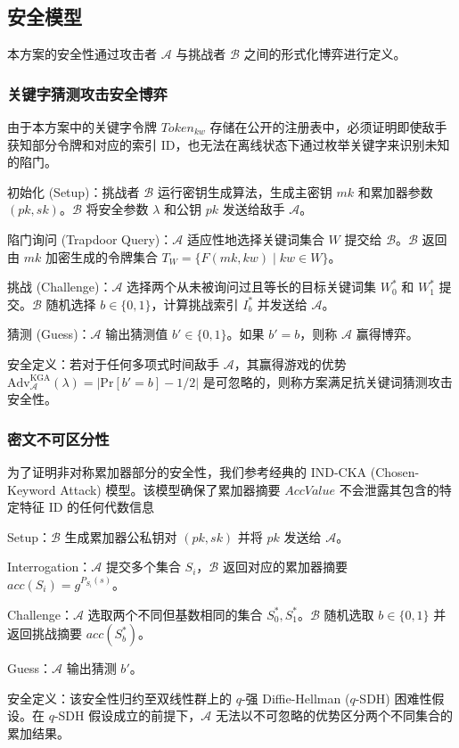 \subsection{安全模型}
本方案的安全性通过攻击者 $\mathcal{A}$ 与挑战者 $\mathcal{B}$ 之间的形式化博弈进行定义。
\subsubsection{关键字猜测攻击安全博弈}
由于本方案中的关键字令牌 $Token_{kw}$ 存储在公开的注册表中，必须证明即使敌手获知部分令牌和对应的索引 ID，也无法在离线状态下通过枚举关键字来识别未知的陷门。

初始化 (Setup)：挑战者 $\mathcal{B}$ 运行密钥生成算法，生成主密钥 $mk$ 和累加器参数 $(pk, sk)$。$\mathcal{B}$ 将安全参数 $\lambda$ 和公钥 $pk$ 发送给敌手 $\mathcal{A}$。

陷门询问 (Trapdoor Query)：$\mathcal{A}$ 适应性地选择关键词集合 $W$ 提交给 $\mathcal{B}$。$\mathcal{B}$ 返回由 $mk$ 加密生成的令牌集合 $T_W = \{F(mk, kw) \mid kw \in W\}$。

挑战 (Challenge)：$\mathcal{A}$ 选择两个从未被询问过且等长的目标关键词集 $W_0^*$ 和 $W_1^*$ 提交。$\mathcal{B}$ 随机选择 $b \in \{0,1\}$，计算挑战索引 $I_b^*$ 并发送给 $\mathcal{A}$。

猜测 (Guess)：$\mathcal{A}$ 输出猜测值 $b' \in \{0, 1\}$。如果 $b' = b$，则称 $\mathcal{A}$ 赢得博弈。

安全定义：若对于任何多项式时间敌手 $\mathcal{A}$，其赢得游戏的优势 $\mathrm{Adv}_{\mathcal{A}}^{\mathrm{KGA}}(\lambda) = |\mathrm{Pr}[b'=b] - 1/2|$ 是可忽略的，则称方案满足抗关键词猜测攻击安全性。
\subsubsection{密文不可区分性}
为了证明非对称累加器部分的安全性，我们参考经典的 IND-CKA (Chosen-Keyword Attack) 模型。该模型确保了累加器摘要 $AccValue$ 不会泄露其包含的特定特征 ID 的任何代数信息

Setup：$\mathcal{B}$ 生成累加器公私钥对 $(pk, sk)$ 并将 $pk$ 发送给 $\mathcal{A}$。

Interrogation：$\mathcal{A}$ 提交多个集合 $S_i$，$\mathcal{B}$ 返回对应的累加器摘要 $acc(S_i) = g^{P_{S_i}(s)}$。

Challenge：$\mathcal{A}$ 选取两个不同但基数相同的集合 $S_0^*, S_1^*$。$\mathcal{B}$ 随机选取 $b \in \{0, 1\}$ 并返回挑战摘要 $acc(S_b^*)$。

Guess：$\mathcal{A}$ 输出猜测 $b'$。

安全定义：该安全性归约至双线性群上的 $q$-强 Diffie-Hellman ($q$-SDH) 困难性假设。在 $q$-SDH 假设成立的前提下，$\mathcal{A}$ 无法以不可忽略的优势区分两个不同集合的累加结果。


